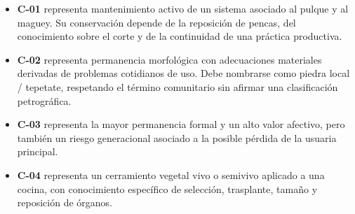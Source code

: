 \begin{itemize}
	\item \textbf{C-01} representa mantenimiento activo de un sistema asociado al pulque y al maguey. Su conservación depende de la reposición de pencas, del conocimiento sobre el corte y de la continuidad de una práctica productiva.
	\item \textbf{C-02} representa permanencia morfológica con adecuaciones materiales derivadas de problemas cotidianos de uso. Debe nombrarse como piedra local / tepetate, respetando el término comunitario sin afirmar una clasificación petrográfica.
	\item \textbf{C-03} representa la mayor permanencia formal y un alto valor afectivo, pero también un riesgo generacional asociado a la posible pérdida de la usuaria principal.
	\item \textbf{C-04} representa un cerramiento vegetal vivo o semivivo aplicado a una cocina, con conocimiento específico de selección, trasplante, tamaño y reposición de órganos.
\end{itemize}
